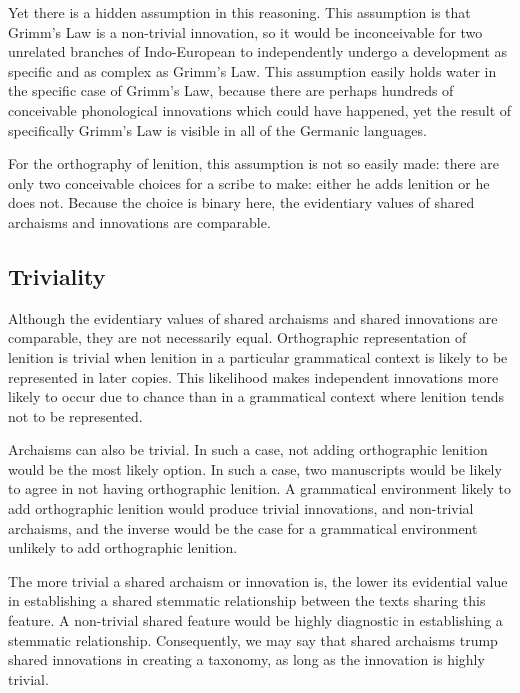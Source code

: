 Yet there is a hidden assumption  in this reasoning. This assumption is that Grimm's Law is a non-trivial innovation, so it would be inconceivable for two unrelated branches of Indo-European to independently undergo a development as specific and as complex as Grimm's Law.  This assumption easily holds water in the specific case of Grimm's Law, because there are perhaps hundreds of conceivable phonological innovations which could have happened, yet the result of specifically Grimm's Law is visible in all of the Germanic languages.

For the orthography of lenition, this assumption is not so easily made: there are only two conceivable choices for a scribe to make: either he adds lenition or he does not. Because the choice is binary here, the evidentiary values of shared archaisms and innovations are comparable.

\subsection{Triviality}
\label{sec:more-fund-disc}
Although the evidentiary values of shared archaisms and shared innovations are comparable, they are not necessarily equal. Orthographic representation of lenition is trivial when lenition in a particular grammatical context is likely to be represented in later copies. This likelihood makes independent innovations more likely to occur due to chance than in a grammatical context where lenition tends not to be represented.

Archaisms can also be trivial. In such a case, not adding orthographic lenition would be the most likely option. In such a case, two manuscripts would be likely to agree in not having orthographic lenition. A grammatical environment likely to add orthographic lenition would produce trivial innovations, and non-trivial archaisms, and the inverse would be the case for a grammatical environment unlikely to add orthographic lenition.

The more trivial a shared archaism or innovation is, the lower its evidential value in establishing a shared stemmatic relationship between the texts sharing this feature. A non-trivial shared feature would be highly diagnostic in establishing a stemmatic relationship. Consequently, we may say that shared archaisms trump shared innovations in creating a taxonomy, as long as the innovation is highly trivial.

